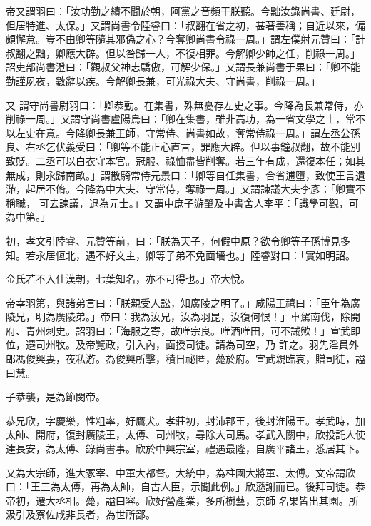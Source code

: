 \begin{pinyinscope}
 帝又謂羽曰：「汝功勤之績不聞於朝，阿黨之音頻干朕聽。今黜汝錄尚書、廷尉，但居特進、太保。」又謂尚書令陸睿曰：「叔翻在省之初，甚著善稱；自近以來，偏頗懈怠。豈不由卿等隨其邪偽之心？今奪卿尚書令祿一周。」謂左僕射元贊曰：「計叔翻之黜，卿應大辟。但以咎歸一人，不復相罪。今解卿少師之任，削祿一周。」詔吏部尚書澄曰：「觀叔父神志驕傲，可解少保。」又謂長兼尚書于果曰：「卿不能勤謹夙夜，數辭以疾。今解卿長兼，可光祿大夫、守尚書，削祿一周。」



 又
 謂守尚書尉羽曰：「卿恭勤。在集書，殊無憂存左史之事。今降為長兼常侍，亦削祿一周。」又謂守尚書盧陽烏曰：「卿在集書，雖非高功，為一省文學之士，常不以左史在意。今降卿長兼王師，守常侍、尚書如故，奪常侍祿一周。」謂左丞公孫良、右丞乞伏義受曰：「卿等不能正心直言，罪應大辟。但以事鐘叔翻，故不能別致貶。二丞可以白衣守本官。冠服、祿恤盡皆削奪。若三年有成，還復本任；如其無成，則永歸南畝。」謂散騎常侍元景曰：「卿等自任集書，合省逋墮，致使王言遺滯，起居不脩。今降為中大夫、守常侍，奪祿一周。」又謂諫議大夫李彥：「卿實不稱職，
 可去諫議，退為元士。」又謂中庶子游肇及中書舍人李平：「識學可觀，可為中第。」



 初，孝文引陸睿、元贊等前，曰：「朕為天子，何假中原？欲令卿等子孫博見多知。若永居恆北，遇不好文主，卿等子弟不免面墻也。」陸睿對曰：「實如明詔。



 金氏若不入仕漢朝，七葉知名，亦不可得也。」帝大悅。



 帝幸羽第，與諸弟言曰：「朕親受人訟，知廣陵之明了。」咸陽王禧曰：「臣年為廣陵兄，明為廣陵弟。」帝曰：我為汝兄，汝為羽昆，汝復何恨！」車駕南伐，除開府、青州刺史。詔羽曰：「海服之寄，故唯宗良。唯酒唯田，可不誡歟！」宣武即位，遷司州牧。及帝覽政，引入內，面授司徒。請為司空，乃
 許之。羽先淫員外郎馮俊興妻，夜私游。為俊興所擊，積日祕匿，薨於府。宣武親臨哀，贈司徒，謚曰慧。



 子恭襲，是為節閔帝。



 恭兄欣，字慶樂，性粗率，好鷹犬。孝莊初，封沛郡王，後封淮陽王。孝武時，加太師、開府，復封廣陵王，太傅、司州牧，尋除大司馬。孝武入關中，欣投託人使達長安，為太傅、錄尚書事。欣於中興宗室，禮遇最隆，自廣平諸王，悉居其下。



 又為大宗師，進大冢宰、中軍大都督。大統中，為柱國大將軍、太傅。文帝謂欣曰：「王三為太傅，再為太師，自古人臣，示聞此例。」欣遜謝而已。後拜司徒。恭帝初，遷大丞相。薨，謚曰容。欣好營產業，多所樹藝，京師
 名果皆出其園。所汲引及寮佐咸非長者，為世所鄙。




\end{pinyinscope}
